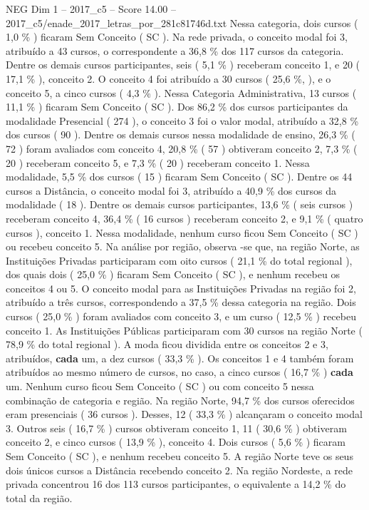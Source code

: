 \begin{textsample}{NEG Dim 1 – 2017\_c5 – Score 14.00 – 2017\_c5/enade\_2017\_letras\_por\_281c81746d.txt}
Nessa categoria, dois cursos ( 1,0 \% ) ficaram Sem Conceito ( SC ).
Na rede privada, o conceito modal foi 3, atribuído a 43 cursos, o correspondente a 36,8 \% dos 117 cursos da categoria.
Dentre os demais cursos participantes, seis ( 5,1 \% ) receberam conceito 1, e 20 ( 17,1 \% ), conceito 2.
O conceito 4 foi atribuído a 30 cursos ( 25,6 \%, ), e o conceito 5, a cinco cursos ( 4,3 \% ).
Nessa Categoria Administrativa, 13 cursos ( 11,1 \% ) ficaram Sem Conceito ( SC ).
Dos 86,2 \% dos cursos participantes da modalidade Presencial ( 274 ), o conceito 3 foi o valor modal, atribuído a 32,8 \% dos cursos ( 90 ).
Dentre os demais cursos nessa modalidade de ensino, 26,3 \% ( 72 ) foram avaliados com conceito 4, 20,8 \% ( 57 ) obtiveram conceito 2, 7,3 \% ( 20 ) receberam conceito 5, e 7,3 \% ( 20 ) receberam conceito 1.
Nessa modalidade, 5,5 \% dos cursos ( 15 ) ficaram Sem Conceito ( SC ).
Dentre os 44 cursos a Distância, o conceito modal foi 3, atribuído a 40,9 \% dos cursos da modalidade ( 18 ).
Dentre os demais cursos participantes, 13,6 \% ( seis cursos ) receberam conceito 4, 36,4 \% ( 16 cursos ) receberam conceito 2, e 9,1 \% ( quatro cursos ), conceito 1.
Nessa modalidade, nenhum curso ficou Sem Conceito ( SC ) ou recebeu conceito 5.
Na análise por região, observa -se que, na região Norte, as Instituições Privadas participaram com oito cursos ( 21,1 \% do total regional ), dos quais dois ( 25,0 \% ) ficaram Sem Conceito ( SC ), e nenhum recebeu os conceitos 4 ou 5.
O conceito modal para as Instituições Privadas na região foi 2, atribuído a três cursos, correspondendo a 37,5 \% dessa categoria na região.
Dois cursos ( 25,0 \% ) foram avaliados com conceito 3, e um curso ( 12,5 \% ) recebeu conceito 1.
As Instituições Públicas participaram com 30 cursos na região Norte ( 78,9 \% do total regional ).
A moda ficou dividida entre os conceitos 2 e 3, atribuídos, \textbf{cada} um, a dez cursos ( 33,3 \% ).
Os conceitos 1 e 4 também foram atribuídos ao mesmo número de cursos, no caso, a cinco cursos ( 16,7 \% ) \textbf{cada} um.
Nenhum curso ficou Sem Conceito ( SC ) ou com conceito 5 nessa combinação de categoria e região.
Na região Norte, 94,7 \% dos cursos oferecidos eram presenciais ( 36 cursos ).
Desses, 12 ( 33,3 \% ) alcançaram o conceito modal 3.
Outros seis ( 16,7 \% ) cursos obtiveram conceito 1, 11 ( 30,6 \% ) obtiveram conceito 2, e cinco cursos ( 13,9 \% ), conceito 4.
Dois cursos ( 5,6 \% ) ficaram Sem Conceito ( SC ), e nenhum recebeu conceito 5.
A região Norte teve os seus dois únicos cursos a Distância recebendo conceito 2.
Na região Nordeste, a rede privada concentrou 16 dos 113 cursos participantes, o equivalente a 14,2 \% do total da região.

\end{textsample}
